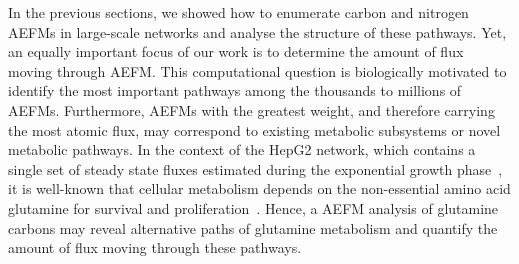 \documentclass[12pt]{article}
\begin{document}

In the previous sections, we showed how to enumerate carbon and nitrogen
AEFMs in large-scale networks and analyse the structure of these pathways.
Yet, an equally important focus of our work is to determine the amount of
flux moving through AEFM. This computational question is biologically
motivated to identify the most important pathways among the thousands to
millions of AEFMs. Furthermore, AEFMs with the greatest weight, and
therefore carrying the most atomic flux, may correspond to existing
metabolic subsystems or novel metabolic pathways. In the context of the
HepG2 network, which contains a single set of steady state fluxes
estimated during the exponential growth
phase~\citep{NilssonAvlant2020Qaoa}, it is well-known that cellular
metabolism depends on the non-essential amino acid glutamine for survival
and proliferation~\citep{YeYanyan2023Gmri,YooHeeChan2020Gric}. Hence,
a AEFM analysis of glutamine carbons may reveal alternative paths of
glutamine metabolism and quantify the amount of flux moving through these
pathways.



\end{document}
